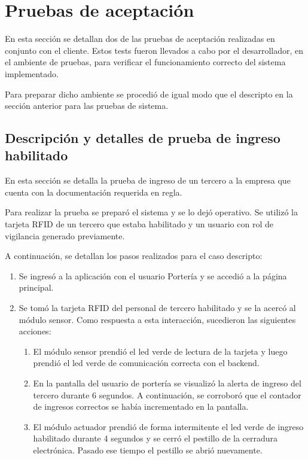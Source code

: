 \pagebreak
\section{Pruebas de aceptación}\label{sec:PruebasAceptacion}

En esta sección se detallan dos de las pruebas de aceptación realizadas en conjunto con el cliente. Estos tests fueron llevados a cabo por el desarrollador, en el ambiente de pruebas, para verificar el funcionamiento correcto del sistema implementado.

Para preparar dicho ambiente se procedió de igual modo que el descripto en la sección anterior para las pruebas de sistema.

\subsection{Descripción y detalles de prueba de ingreso habilitado}

En esta sección se detalla la prueba de ingreso de un tercero a la empresa que cuenta con la documentación requerida en regla.

Para realizar la prueba se preparó el sistema y se lo dejó operativo. Se utilizó la tarjeta RFID de un tercero que estaba habilitado y un usuario con rol de vigilancia generado previamente.

A continuación, se detallan los pasos realizados para el caso descripto:

\begin{enumerate}
\item Se ingresó a la aplicación con el usuario Portería y se accedió a la página principal.
\item Se tomó la tarjeta RFID del personal de tercero habilitado y se la acercó al módulo sensor. Como respuesta a esta interacción, sucedieron las siguientes acciones:

	\begin{enumerate}
	\item El módulo sensor prendió el led verde de lectura de la tarjeta y luego prendió el led verde de comunicación correcta con el backend.
	\item En la pantalla del usuario de portería se visualizó la alerta de ingreso del tercero durante 6 segundos. A continuación, se corroboró que el contador de ingresos correctos se había incrementado en la pantalla.
	\item El módulo actuador prendió de forma intermitente el led verde de ingreso habilitado durante 4 segundos y se cerró el pestillo de la cerradura electrónica. Pasado ese tiempo el pestillo se abrió nuevamente.
	\end{enumerate}


\end{enumerate}

